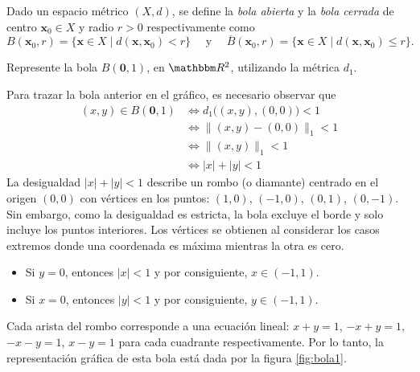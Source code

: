\begin{definicion}{}{}
    Dado un espacio métrico $(X, d)$, se define la \emph{bola abierta} y la \emph{bola cerrada} de centro $\mathbf{x}_0 \in X$ y radio $r > 0$ respectivamente como 
    $$B(\mathbf{x}_0, r) = \{ \mathbf{x} \in X \mid d(\mathbf{x}, \mathbf{x}_0) < r \} \quad \text{ y } \quad \overline{B}(\mathbf{x}_0, r) = \{ \mathbf{x} \in X \mid d(\mathbf{x}, \mathbf{x}_0) \leq r \}.$$
\end{definicion}


\begin{examplebox}{}{}
    Represente la bola $B(\mathbf{0}, 1)$, en $\RR[2]$, utilizando la métrica $d_1$.

    \tcblower
    \solucion Para trazar la bola anterior en el gráfico, es necesario observar que
    \begin{align*}
        (x, y) \in B( \mathbf{0}, 1) & \Longleftrightarrow d_1 \big( (x, y), (0, 0) \big) < 1 \\
        & \Longleftrightarrow \| (x, y) - (0, 0) \|_1 < 1 \\
        & \Longleftrightarrow \| (x, y) \|_1 < 1 \\
        & \Longleftrightarrow |x| + |y| < 1
    \end{align*}
    La desigualdad $|x| + |y| < 1$ describe un rombo (o diamante) centrado en el origen $(0, 0)$ con vértices en los puntos: $(1, 0)$, $(-1, 0)$, $(0, 1)$, $(0, -1)$. Sin embargo, como la desigualdad es estricta, la bola excluye el borde y solo incluye los puntos interiores. Los vértices se obtienen al considerar los casos extremos donde una coordenada es máxima mientras la otra es cero.
    \begin{itemize}[topsep=6pt, itemsep=0pt]
        \item Si $y = 0$, entonces $|x| < 1$ y por consiguiente, $x \in (-1, 1)$.
        \item Si $x = 0$, entonces $|y| < 1$ y por consiguiente, $y \in (-1, 1)$.
    \end{itemize}
    Cada arista del rombo corresponde a una ecuación lineal: $x + y = 1$, $-x + y = 1$, $-x - y = 1$, $x - y = 1$ para cada cuadrante respectivamente. Por lo tanto, la representación gráfica de esta bola está dada por la figura \ref{fig:bola1}.
\end{examplebox}

